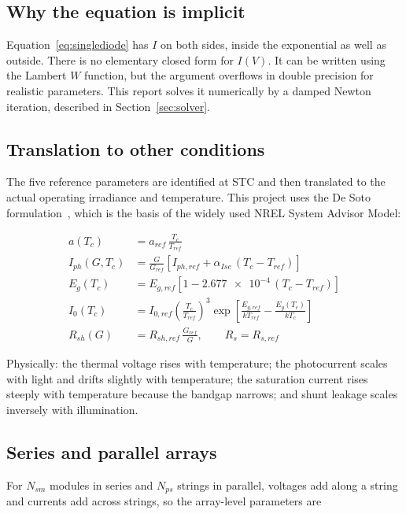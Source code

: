 \subsection{Why the equation is implicit}

Equation~\eqref{eq:singlediode} has $I$ on both sides, inside the exponential as
well as outside. There is no elementary closed form for $I(V)$. It can be
written using the Lambert $W$ function, but the argument overflows in double
precision for realistic parameters. This report solves it numerically by a
damped Newton iteration, described in Section~\ref{sec:solver}.

\subsection{Translation to other conditions}

The five reference parameters are identified at STC and then translated to the
actual operating irradiance and temperature. This project uses the De Soto
formulation~\cite{desoto}, which is the basis of the widely used NREL System
Advisor Model:

\begin{align}
a(T_c) &= a_{ref}\,\frac{T_c}{T_{ref}} \label{eq:tr_a}\\
I_{ph}(G,T_c) &= \frac{G}{G_{ref}}\left[I_{ph,ref} + \alpha_{Isc}\,(T_c - T_{ref})\right] \label{eq:tr_iph}\\
E_g(T_c) &= E_{g,ref}\left[1 - \num{2.677e-4}\,(T_c - T_{ref})\right] \label{eq:tr_eg}\\
I_0(T_c) &= I_{0,ref}\left(\frac{T_c}{T_{ref}}\right)^{\!3}\exp\!\left[\frac{E_{g,ref}}{k T_{ref}} - \frac{E_g(T_c)}{k T_c}\right] \label{eq:tr_i0}\\
R_{sh}(G) &= R_{sh,ref}\,\frac{G_{ref}}{G}, \qquad R_s = R_{s,ref} \label{eq:tr_r}
\end{align}

Physically: the thermal voltage rises with temperature; the photocurrent scales
with light and drifts slightly with temperature; the saturation current rises
steeply with temperature because the bandgap narrows; and shunt leakage scales
inversely with illumination.

\subsection{Series and parallel arrays}

For $N_{sm}$ modules in series and $N_{ps}$ strings in parallel, voltages add
along a string and currents add across strings, so the array-level parameters
are

